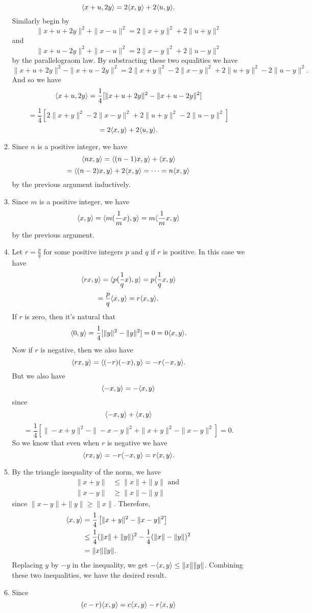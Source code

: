 \begin{enumerate}
\begin{enumerate}
\[\langle x+u,2y\rangle =2\langle x,y\rangle +2\langle u,y\rangle .\]
Similarly begin by 
\[\|x+u+2y\|^2+\|x-u\|^2=2\|x+y\|^2+2\|u+y\|^2\]
and 
\[\|x+u-2y\|^2+\|x-u\|^2=2\|x-y\|^2+2\|u-y\|^2\]
by the parallelograom law. By substracting these two equalities we have 
\[\|x+u+2y\|^2-\|x+u-2y\|^2=2\|x+y\|^2-2\|x-y\|^2+2\|u+y\|^2-2\|u-y\|^2.\]
And so we have 
\[\langle x+u,2y\rangle =\frac{1}{4}[\|x+u+2y\|^2-\|x+u-2y\|^2]\]
\[=\frac{1}{4}[2\|x+y\|^2-2\|x-y\|^2+2\|u+y\|^2-2\|u-y\|^2]\]
\[=2\langle x,y\rangle +2\langle u,y\rangle .\]
\item Since $n$ is a positive integer, we have 
\[\langle nx,y\rangle =\langle (n-1)x,y\rangle +\langle x,y\rangle \]
\[=\langle (n-2)x,y\rangle +2\langle x,y\rangle =\cdots =n\langle x,y\rangle \]
by the previous argument inductively.
\item Since $m$ is a positive integer, we have 
\[\langle x,y\rangle =\langle m(\frac{1}{m}x),y\rangle =m\langle \frac{1}{m}x,y\rangle \]
by the previous argument.
\item Let $r=\frac{p}{q}$ for some positive integers $p$ and $q$ if $r$ is positive. In this case we have 
\[\langle rx,y\rangle =\langle p(\frac{1}{q}x),y\rangle =p\langle \frac{1}{q}x,y\rangle \]
\[=\frac{p}{q}\langle x,y\rangle =r\langle x,y\rangle .\]
If $r$ is zero, then it's natural that 
\[\langle 0,y\rangle =\frac{1}{4}[\|y\|^2-\|y\|^2]=0=0\langle x,y\rangle .\]
Now if $r$ is negative, then we also have 
\[\langle rx,y\rangle =\langle (-r)(-x),y\rangle =-r\langle -x,y\rangle .\]
But we also have 
\[\langle -x,y\rangle =-\langle x,y\rangle \]
since 
\[\langle -x,y\rangle +\langle x,y\rangle \]
\[=\frac{1}{4}[\|-x+y\|^2-\|-x-y\|^2+\|x+y\|^2-\|x-y\|^2]=0.\]
So we know that even when $r$ is negative we have 
\[\langle rx,y\rangle =-r\langle -x,y\rangle =r\langle x,y\rangle .\]
\item By the triangle inequality of the norm, we have 
\[\begin{aligned}
    \|x + y\| &\leq \|x\| + \|y\| \text{ and }\\
    \|x - y\| &\geq \|x\| - \|y\|
\end{aligned}\]
since $\|x - y\| + \|y\| \geq \|x\|$.  Therefore, 
\[\begin{aligned}
    \langle x,y \rangle &= \frac{1}{4}\left[\|x + y\|^2 - \|x - y\|^2\right] \\
     &\leq \frac{1}{4}(\|x\| + \|y\|)^2 - \frac{1}{4}(\|x\| - \|y\|)^2 \\
     &= \|x\|\|y\|.
\end{aligned}\]
Replacing $y$ by $-y$ in the inequality, we get $-\langle x,y\rangle \leq \|x\|\|y\|$.  Combining these two inequalities, we have the desired result.
\item Since 
\[(c-r)\langle x,y\rangle =c\langle x,y\rangle -r\langle x,y\rangle\]

\end{enumerate}
\end{enumerate}
